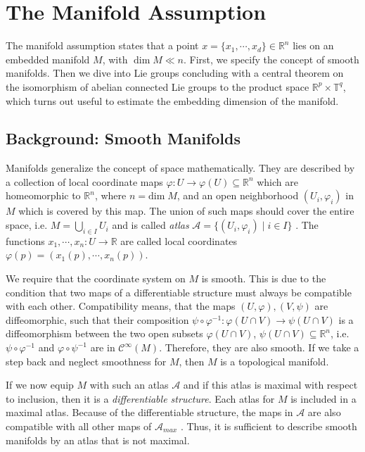 \documentclass[envcountsect,runningheads]{llncs}
\begin{document}
\section{The Manifold Assumption}
\label{sec:manifoldassumption}
The manifold assumption states that a point $x = \{x_1, \cdots, x_d\} \in \mathbb{R}^n$ lies on an embedded manifold $M$, with $\dim M \ll n$. First, we specify the concept of smooth manifolds. Then we dive into Lie groups concluding with a central theorem on the isomorphism of abelian connected Lie groups to the product space $\mathbb{R}^p \times \mathbb{T}^q$, which turns out useful to estimate the embedding dimension of the manifold.

\subsection{Background: Smooth Manifolds}
Manifolds generalize the concept of space mathematically. They are described by a collection of local coordinate maps $\varphi: U \rightarrow \varphi(U) \subseteq \mathbb{R}^n$ which are homeomorphic to $\mathbb{R}^{n}$, where $n = \text{dim} \; M$, and an open neighborhood $(U_i,\varphi_i)$ in $M$ which is covered by this map. The union of such maps should cover the entire space, i.e. $M = \bigcup_{i \in I} U_i$ and is called \textit{atlas} $\mathcal{A} = \{(U_i,\varphi_i) \; \vert \; i \in I\}$ . The functions $x_1, \cdots, x_n: U \rightarrow \mathbb{R}$ are called local coordinates $\varphi(p) = (x_1(p), \cdots, x_n(p))$. 

We require that the coordinate system on $M$ is smooth. This is due to the condition that two maps of a differentiable structure must always be compatible with each other. Compatibility means, that the maps $(U,\varphi), (V,\psi)$ are diffeomorphic, such that their composition $\psi \circ \varphi^{-1}:\varphi(U \cap V) \rightarrow \psi(U \cap V)$ is a diffeomorphism between the two open subsets $\varphi(U \cap V)$, $\psi(U \cap V) \subseteq \mathbb{R}^n$, i.e. $\psi \circ \varphi^{-1}$ and $\varphi \circ \psi^{-1}$ are in $\mathcal{C}^\infty(M)$. Therefore, they are also smooth. If we take a step back and neglect smoothness for $M$, then $M$ is a topological manifold. 

If we now equip $M$ with such an atlas $\mathcal{A}$ and if this atlas is maximal with respect to inclusion, then it is a \emph{differentiable structure}. Each atlas for $M$ is included in a maximal atlas. Because of the differentiable structure, the maps in $\mathcal{A}$ are also compatible with all other maps of $\mathcal{A}_{max}$ . Thus, it is sufficient to describe smooth manifolds by an atlas that is not maximal.
\end{document}
